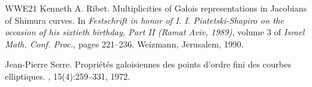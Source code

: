 \documentclass[a4paper, notitlepage, 10pt]{amsart}
\theoremstyle{plain} %
\theoremstyle{definition} %
\theoremstyle{remark} %
\numberwithin{equation}{section}
\begin{document}
\begin{thebibliography}{WWE21}
    Kenneth A. Ribet.
\newblock Multiplicities of {G}alois representations in {J}acobians of
  {S}himura curves.
\newblock In {\em Festschrift in honor of {I}. {I}. {P}iatetski-{S}hapiro on
  the occasion of his sixtieth birthday, {P}art {II} ({R}amat {A}viv, 1989)},
  volume 3 of {\em Israel Math. Conf. Proc.}, pages 221--236. Weizmann,
  Jerusalem, 1990.

    Jean-Pierre Serre.
\newblock Propri\'et\'es galoisiennes des points d'ordre fini des courbes
  elliptiques.
, 15(4):259--331, 1972.


\end{thebibliography}
\end{document}
